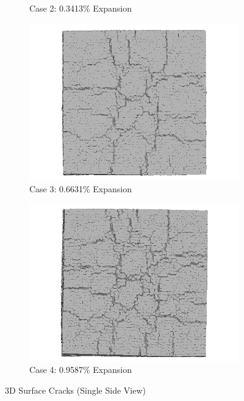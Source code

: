\begin{figure}[!h]
\begin{subfigure}{.5\textwidth}
    \caption{Case 2: 0.3413\% Expansion}
    \end{subfigure}%
    \begin{subfigure}{.5\textwidth}
      \centering
      \includegraphics[width=.8\linewidth]{Files/exp_3D/DEF/A15X0C_3_3ds.png}
    \caption{Case 3: 0.6631\% Expansion}
    \end{subfigure}
    \begin{subfigure}{.5\textwidth}
      \centering
      \includegraphics[width=.8\linewidth]{Files/exp_3D/DEF/A15X0C_4_3ds.png}
    \caption{Case 4: 0.9587\% Expansion}
    \end{subfigure}%

  \caption{3D Surface Cracks (Single Side View)}
  \label{fig:ASR_A15X0C_3DS}
\end{figure}

